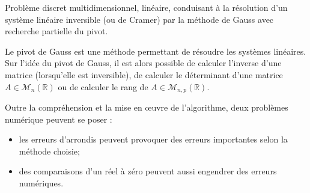 \documentclass[10pt]{article}
\begin{document}

\begin{minipage}[c]{.2\linewidth}
\begin{center}
\end{center}
\end{minipage}\hfill
\begin{minipage}[c]{.33\linewidth}
\begin{center}
\end{center}
\end{minipage}\hfill
\begin{minipage}[c]{.45\linewidth}
\begin{center}
\end{center}
\end{minipage}
\vspace{.5cm}

\begin{savoir}
Problème discret multidimensionnel, linéaire, conduisant à la résolution d’un système linéaire inversible (ou de Cramer) par la méthode de Gauss avec recherche partielle du pivot.

\end{savoir}


Le pivot de Gauss est une méthode permettant de résoudre les systèmes linéaires. Sur l'idée du pivot de Gauss, il est alors possible de calculer l'inverse d'une matrice (lorsqu'elle est inversible), de calculer le déterminant d'une matrice $A\in\mathcal{M}_n(\mathbb{R})$ ou de calculer le rang de 
$A\in\mathcal{M}_{n,p}(\mathbb{R})$.

\begin{prob}
Outre la compréhension et la mise en \oe{}uvre de l'algorithme, deux problèmes numérique peuvent se poser : 
\begin{itemize}
\item les erreurs d'arrondis peuvent provoquer des erreurs importantes selon la méthode choisie;
\item des comparaisons d'un réel à zéro peuvent aussi engendrer des erreurs numériques.
\end{itemize}
\end{prob}
\end{document}
